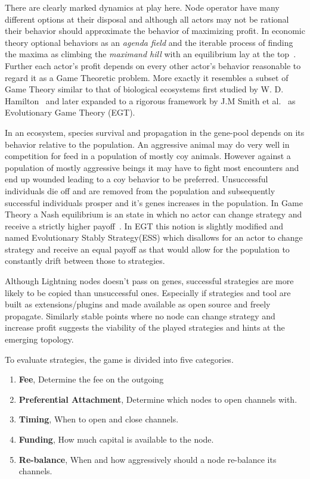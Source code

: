 There are clearly marked dynamics at play here. Node operator have many different options at their disposal and although all actors may not be rational their behavior should approximate the behavior of maximizing profit. In economic theory optional behaviors as an \textit{agenda field} and the iterable process of finding the maxima as climbing the \textit{maximand hill} with an equilibrium lay at the top~\cite{boulding:evolutionary:economy}. Further each actor's profit depends on every other actor's behavior reasonable to regard it as a Game Theoretic problem. More exactly it resembles a subset of Game Theory similar to that of biological ecosystems first studied by W. D. Hamilton~\cite{hamilton:behavior} and later expanded to a rigorous framework by J.M Smith et al.~\cite{smith:price:logic:animal, smith:evolution:games} as Evolutionary Game Theory (EGT).

In an ecosystem, species survival and propagation in the gene-pool depends on its behavior relative to the population. An aggressive animal may do very well in competition for feed in a population of mostly coy animals. However against a population of mostly aggressive beings it may have to fight most encounters and end up wounded leading to a coy behavior to be preferred. Unsuccessful individuals die off and are removed from the population and subsequently successful individuals prosper and it's genes increases in the population. In Game Theory a Nash equilibrium is an state in which no actor can change strategy and receive a strictly higher payoff~\cite{nash:equilibrium}. In EGT this notion is slightly modified and named Evolutionary Stably Strategy(ESS) which disallows for an actor to change strategy and receive an equal payoff as that would allow for the population to constantly drift between those to strategies. 


Although Lightning nodes doesn't pass on genes, successful strategies are more likely to be copied than unsuccessful ones. Especially if strategies and tool are built as extensions/plugins and made available as open source and freely propagate. Similarly stable points where no node can change strategy and increase profit suggests the viability of the played strategies and hints at the emerging topology. 

To evaluate strategies, the game is divided into five categories.

\begin{enumerate}
	\item \textbf{Fee}, Determine the fee on the outgoing
	\item \textbf{Preferential Attachment}, Determine which nodes to open channels with.
	\item \textbf{Timing}, When to open and close channels.
	\item \textbf{Funding}, How much capital is available to the node.
	\item \textbf{Re-balance}, When and how aggressively should a node re-balance its channels.  
\end{enumerate}

